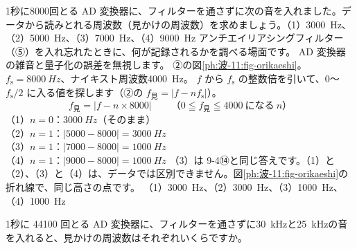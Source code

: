 \label{ph:波-11:ex3}
\begin{phreidai}
1秒に8000回とる AD 変換器に、フィルターを通さずに次の音を入れました。データから読みとれる周波数（見かけの周波数）を求めましょう。（1）\qty{3000}{Hz}、（2）\qty{5000}{Hz}、（3）\qty{7000}{Hz}、（4）\qty{9000}{Hz}
\phbamen
アンチエイリアシングフィルター（⑤）を入れ忘れたときに、何が記録されるかを調べる場面です。
\phmushi
AD 変換器の雑音と量子化の誤差を無視します。
\phzu
②の図\ref{ph:波-11:fig-orikaeshi}。$f_{\mathrm s}=\qty{8000}{Hz}$、ナイキスト周波数\qty{4000}{Hz}。
\phriyu
$f$ から $f_{\mathrm s}$ の整数倍を引いて、0〜$f_{\mathrm s}/2$ に入る値を探します（②の $f_{\text{見}}=|f-nf_{\mathrm s}|$）。
\phtateru
\[f_{\text{見}}=|f-n\times8000|\qquad（0\leqq f_{\text{見}}\leqq4000\ \text{になる}\ n）\]
\phtoku
（1）$n=0$：$\qty{3000}{Hz}$（そのまま）\\
（2）$n=1$：$|5000-8000|=\qty{3000}{Hz}$\\
（3）$n=1$：$|7000-8000|=\qty{1000}{Hz}$\\
（4）$n=1$：$|9000-8000|=\qty{1000}{Hz}$
\phtashikame
（3）は 9-4⑭と同じ答えです。（1）と（2）、（3）と（4）は、データでは区別できません。図\ref{ph:波-11:fig-orikaeshi}の折れ線で、同じ高さの点です。
\kotae （1）\qty{3000}{Hz}、（2）\qty{3000}{Hz}、（3）\qty{1000}{Hz}、（4）\qty{1000}{Hz}
\end{phreidai}
\begin{jibun}
1秒に \num{44100} 回とる AD 変換器に、フィルターを通さずに\qty{30}{kHz}と\qty{25}{kHz}の音を入れると、見かけの周波数はそれぞれいくらですか。
\end{jibun}

